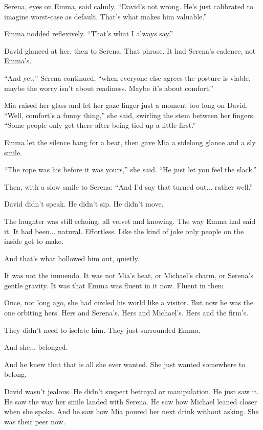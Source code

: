 Serena, eyes on Emma, said calmly, ``David’s not wrong. He’s just calibrated to imagine worst-case 
as default. That’s what makes him valuable.''

Emma nodded reflexively. ``That’s what I always say.''

David glanced at her, then to Serena. That phrase. It had Serena’s cadence, not Emma’s. 

``And yet,'' Serena continued, ``when everyone else agrees the posture is viable, maybe the worry 
isn’t about readiness. Maybe it’s about comfort.''

Mia raised her glass and let her gaze linger just a moment too long on David.
``Well, comfort’s a funny thing,'' she said, swirling the stem between her fingers.
``Some people only get there after being tied up a little first.''

Emma let the silence hang for a beat, then gave Mia a sidelong glance and a sly smile.

``The rope was his before it was yours,'' she said. ``He just let you feel the slack.''

Then, with a slow smile to Serena:
``And I’d say that turned out... rather well.''

David didn’t speak. He didn’t sip. He didn’t move.

The laughter was still echoing, all velvet and knowing. The way Emma had said it. 
It had been... natural. Effortless. Like the kind of joke only people on the 
inside get to make.

And that’s what hollowed him out, quietly.

It was not the innuendo. It was not Mia’s heat, or Michael’s charm, or Serena’s gentle gravity. It was that Emma 
was fluent in it now. Fluent in them.

Once, not long ago, she had circled his world like a visitor. But now he was 
the one orbiting hers. Hers and Serena’s. Hers and Michael’s. Hers and the firm’s.

They didn’t need to isolate him.
They just surrounded Emma.

And she... belonged.

And he knew that that is all she ever wanted. She just wanted somewhere to belong.

David wasn’t jealous. He didn’t suspect betrayal or manipulation. He just saw it. He saw the 
way her smile landed with Serena. He saw how Michael leaned closer when she spoke. And he saw how Mia 
poured her next drink without asking. She was their peer now. 


